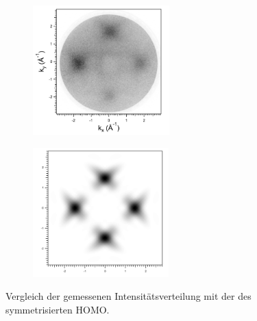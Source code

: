                 \begin{figure}
                    \centering
                    \begin{subfigure}[t]{0.48\textwidth}
                        \centering
                        \includegraphics[height=5cm]{./content/pictures/FeO+5A/FeO_5A_33_75eV.png}
                    \end{subfigure}
                    \begin{subfigure}[t]{0.48\textwidth}
                        \centering
                        \includegraphics[height=5cm]{./content/pictures/FeO+5A/MO_HOMO_RT_RT.png}
                    \end{subfigure}
                    \caption{Vergleich der gemessenen Intensitätsverteilung mit der des symmetrisierten HOMO.}
                    \label{fig:FeO5A2}
                \end{figure}

